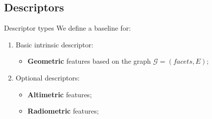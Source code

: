 \documentclass{beamer}
\begin{document}
        \subsection{Descriptors}
            \begin{frame}{Descriptor types}
                We define a baseline for:
                \begin{enumerate}[label = (\roman*)., font=\color{black}]
                    \item<1-> Basic intrinsic descriptor:
                    \begin{itemize}[label=$\blacktriangleright$, font=\color{IGNGreen}]
                        \item<2-> \textbf{Geometric} features based on the graph $\mathscr{G}=(facets, E)$;
                    \end{itemize}
                    \item<3-> Optional descriptors:
                    \begin{itemize}[label=$\blacktriangleright$, font=\color{blue}]
                        \item<4-> \textbf{Altimetric} features;
                        \item<5-> \textbf{Radiometric} features;
                    \end{itemize}
                \end{enumerate}
            \end{frame}
\end{document}
